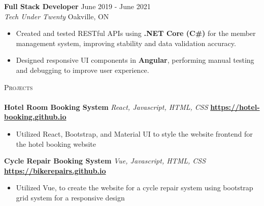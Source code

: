\documentclass[a4paper]{article}
\newcommand{\header} [1] {
    {\hspace*{-18pt}\vspace*{6pt} \textsc{#1}}
    \vspace*{-6pt} \\
    \hspace*{-18pt} \hrulefill \\
}
\begin{document}
\textbf{Full Stack Developer} \hfill June 2019 - June 2021\\
\textit{Tech Under Twenty} \hfill Oakville, ON\\
\vspace{-2mm}
\begin{itemize} \itemsep -2pt
    \item Created and tested RESTful APIs using \textbf{.NET Core (C\#)} for the member management system, improving stability and data validation accuracy.
    \item Designed responsive UI components in \textbf{Angular}, performing manual testing and debugging to improve user experience.
\end{itemize}
\header{Projects}
\vspace{1mm}
{\textbf{Hotel Room Booking System}} {\sl React, Javascript, HTML, CSS} \hfill \textbf{\href{https://muizzzafar11.github.io/hotel-booking/}{https://hotel-booking.github.io}}\\
 \begin{itemize} \itemsep -2pt
    \item Utilized React, Bootstrap, and Material UI to style the website frontend for the hotel booking website 
\end{itemize}
{\textbf{Cycle Repair Booking System}} {\sl Vue, Javascript, HTML, CSS} \hfill \textbf{\href{https://muizzzafar11.github.io/bikerepairs/}{https://bikerepairs.github.io}}\\
 \begin{itemize} \itemsep -2pt
    \item Utilized Vue, to create the website for a cycle repair system using bootstrap grid system for a responsive design
\end{itemize}
\vspace{4mm}
\end{document}
